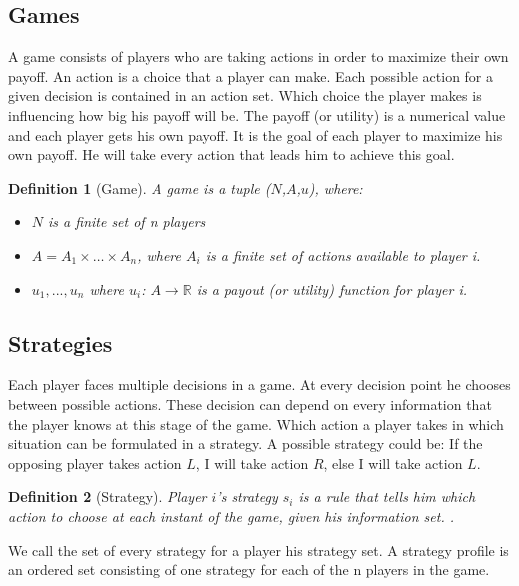 \documentclass{cacthesis}
\newtheorem{definition}{Definition}
\begin{document}
\subsection{Games}
A game consists of players who are taking actions in order to maximize their own payoff. An action is a choice that a player can make. Each possible action for a given decision is contained in an action set. Which choice the player makes is influencing how big his payoff will be. The payoff (or utility) is a numerical value and each player gets his own payoff. It is the goal of each player to maximize his own payoff. He will take every action that leads him to achieve this goal.
\begin{definition}[Game]
A game is a tuple ($N$,$A$,$u$), where:
\begin{itemize}
    \item $N$ is a finite set of n players
    \item $A = A_1 \times \dots \times A_n$, where $A_i$ is a finite set of actions available to player i. %
    \item $u_1,...,u_n$ where $u_i$: $A \to \mathbb{R}$ is a payout (or utility) function for player i.
\end{itemize} {\normalfont \cite{leyton-brown_essentials_2008}}
\end{definition}
\subsection{Strategies}
Each player faces multiple decisions in a game. At every decision point he chooses between possible actions. These decision can depend on every information that the player knows at this stage of the game. Which action a player takes in which situation can be formulated in a strategy. A possible strategy could be: If the opposing player takes action $L$, I will take action $R$, else I will take action $L$.\newline

\begin{definition}[Strategy]
Player $i$'s strategy $s_i$ is a rule that tells him which action to choose at each instant of the game, given his information set. {\normalfont \cite{rasmusen_games_nodate}}.
\end{definition}
We call the set of every strategy for a player his strategy set. A strategy profile is an ordered set consisting of one strategy for each of the n players in the game.\newline
\end{document}
